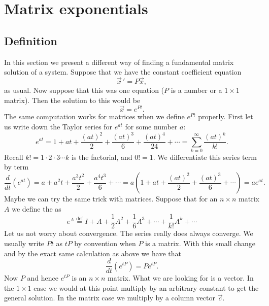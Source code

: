 \documentclass[12pt]{book}
\begin{document}

\sectionnewpage
\section{Matrix exponentials} \label{sec:matexp}


\subsection{Definition}

In this section we present a different way of finding a fundamental
matrix solution of a system.  Suppose that we have the constant
coefficient equation
\begin{equation*}
{\vec{x}\,}' = P \vec{x} ,
\end{equation*}
as usual.  Now suppose that this was one equation ($P$ is a number or a $1
\times 1$ matrix).  Then the solution to this would be
\begin{equation*}
\vec{x} = e^{Pt} .
\end{equation*}
The same computation works for matrices when we define
$e^{Pt}$ properly.  First let us write down the Taylor series for $e^{at}$
for some number $a$:
\begin{equation*}
e^{at} = 1 + at
+ \frac{{(at)}^2}{2}
+ \frac{{(at)}^3}{6}
+ \frac{{(at)}^4}{24}
+ \cdots
= \sum_{k=0}^\infty \frac{{(at)}^k}{k!} .
\end{equation*}
Recall $k! = 1 \cdot 2 \cdot 3 \cdots k$ is the factorial, and $0! = 1$.
We differentiate this series term by term
\begin{equation*}
\frac{d}{dt} \left(e^{at} \right) = 
a
+ a^2 t
+ \frac{a^3t^2}{2}
+ \frac{a^4t^3}{6}
+ \cdots
= a \left(
1
+ a t
+ \frac{{(at)}^2}{2}
+ \frac{{(at)}^3}{6}
+ \cdots \right)
= a e^{at}.
\end{equation*}
Maybe we can try the same trick with matrices.  Suppose that for an $n \times n$
matrix $A$ we define the
\emph{} as
\begin{equation*}
\boxed{~~
e^A \overset{\text{def}}{=} I + A + \frac{1}{2} A^2 + 
\frac{1}{6} A^3 + \cdots + \frac{1}{k!} A^k + \cdots
~~}
\end{equation*}
Let us not worry about convergence.  The series really does
always converge.
We usually write $Pt$ as $tP$ by convention when $P$ is a matrix.
With this small change and by the exact same
calculation as above
we have that
\begin{equation*}
\frac{d}{dt} \left(e^{tP} \right) = 
P e^{tP} .
\end{equation*}
Now $P$ and hence $e^{tP}$ is an $n \times n$ matrix.  What we are looking
for is a vector.  In the $1 \times 1$ case we would at this
point multiply by an arbitrary constant to get the general solution.  In the
matrix case we multiply by a column vector $\vec{c}$.
\end{document}
